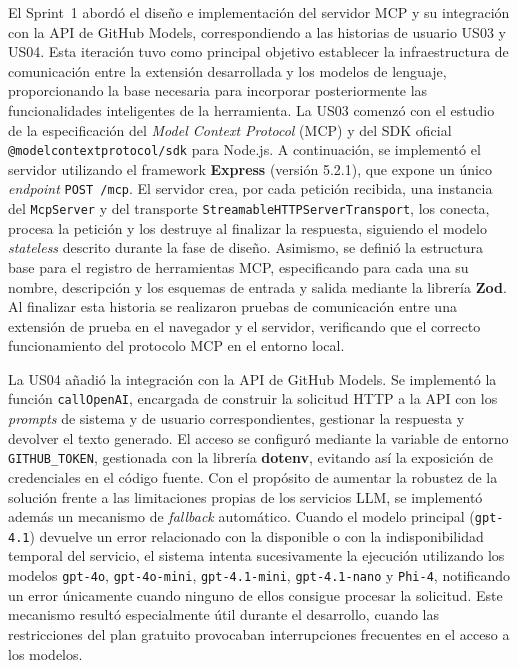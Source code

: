El Sprint~1 abordó el diseño e implementación del servidor MCP y su integración con la API de GitHub Models, correspondiendo a las historias de usuario US03 y US04. Esta iteración tuvo como principal objetivo establecer la infraestructura de comunicación entre la extensión desarrollada y los modelos de lenguaje, proporcionando la base necesaria para incorporar posteriormente las funcionalidades inteligentes de la herramienta.
La US03 comenzó con el estudio de la especificación del \textit{Model Context Protocol} (MCP) y del SDK oficial \texttt{@modelcontextprotocol/sdk} para Node.js. A continuación, se implementó el servidor utilizando el framework \textbf{Express} (versión 5.2.1), que expone un único \textit{endpoint} \texttt{POST /mcp}. El servidor crea, por cada petición recibida, una instancia del \texttt{McpServer} y del transporte \texttt{StreamableHTTPServerTransport}, los conecta, procesa la petición y los destruye al finalizar la respuesta, siguiendo el modelo \textit{stateless} descrito durante la fase de diseño. Asimismo, se definió la estructura base para el registro de herramientas MCP, especificando para cada una su nombre, descripción y  los esquemas de entrada y salida mediante la librería \textbf{Zod}. Al finalizar esta historia se realizaron pruebas de comunicación entre una extensión de prueba en el navegador y el servidor, verificando que el correcto funcionamiento del protocolo MCP en el entorno local.

La US04 añadió la integración con la API de GitHub Models. Se implementó la función \texttt{callOpenAI}, encargada de construir la solicitud HTTP a la API con los \textit{prompts} de sistema y de usuario correspondientes, gestionar la respuesta y devolver el texto generado. El acceso se configuró mediante la variable de entorno \texttt{GITHUB\_TOKEN}, gestionada con la librería \textbf{dotenv}, evitando así la exposición de credenciales en el código fuente. 
Con el propósito de aumentar la robustez de la solución frente a las limitaciones propias de los servicios LLM, se implementó además un mecanismo de \textit{fallback} automático. Cuando el modelo principal (\texttt{gpt-4.1}) devuelve un error  relacionado con la disponible o con la indisponibilidad temporal del servicio, el sistema intenta sucesivamente la ejecución utilizando los modelos \texttt{gpt-4o}, \texttt{gpt-4o-mini}, \texttt{gpt-4.1-mini}, \texttt{gpt-4.1-nano} y \texttt{Phi-4}, notificando un error únicamente cuando ninguno de ellos consigue procesar la solicitud. Este mecanismo resultó especialmente útil durante el desarrollo, cuando las restricciones del plan gratuito provocaban interrupciones frecuentes en el acceso a los modelos.


